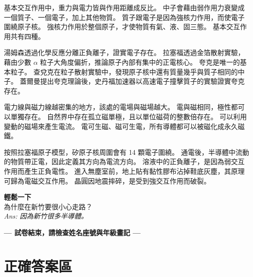 \documentclass[10pt,a4paper]{article}
\begin{document}

{基本交互作用中，重力與電力皆與作用距離成反比。}
{中子會藉由弱作用力衰變成一個質子、一個電子，加上其他物質。}
{質子跟電子是因為強核力作用，而使電子圍繞原子核。}
{強核力作用於整個原子，才使物質有氣、液、固三態。}
{基本交互作用共有四種。}

{湯姆森透過化學反應分離正負離子，證實電子存在。}
{拉塞福透過金箔散射實驗，藉由少數 $\alpha$ 粒子大角度偏折，推論原子內部有集中的正電核心。}
{夸克是唯一的基本粒子。}
{查兌克在粒子散射實驗中，發現原子核中還有質量幾乎與質子相同的中子。}
{蓋爾曼提出夸克理論後，史丹福加速器以高速電子撞擊質子的實驗證實夸克存在。}

{電力線與磁力線越密集的地方，該處的電場與磁場越大。}
{電與磁相同，極性都可以單獨存在。}
{自然界中存在孤立磁單極，且以單位磁荷的整數倍存在。}
{可以利用變動的磁場來產生電流。}
{電可生磁、磁可生電，所有導體都可以被磁化成永久磁鐵。}

{按照拉塞福原子模型，矽原子核周圍會有 14 顆電子圍繞。}
{通電後，半導體中流動的物質帶正電，因此定義其方向為電流方向。}
{溶液中的正負離子，是因為弱交互作用而產生正負電性。}
{進入無塵室前，地上貼有黏性膠布沾掉鞋底灰塵，其原理可歸為電磁交互作用。}
{晶圓因地震摔碎，是受到強交互作用而破裂。}

\vfill
\begin{center}
    \begin{tcolorbox}[colframe=lightgray, colback=white, halign=center, width=0.8\textwidth, arc=2mm]
        \small \textbf{輕鬆一下} \\
        為什麼在新竹要很小心走路？ \\
        \textit{Ans: 因為新竹很多半導體。}
    \end{tcolorbox}
\end{center}
\begin{center}
    \large \textbf{--- 試卷結束，請檢查姓名座號與年級畫記 ---}
\end{center}

\label{EndOfExam}

\newpage
\section*{正確答案區}
\begin{center}
\end{center}
\end{document}
